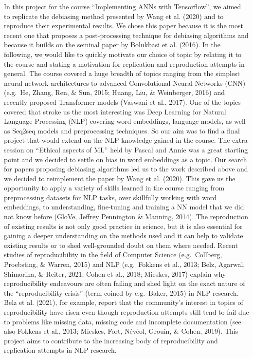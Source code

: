 \documentclass[
  english,
  man,floatsintext]{apa6}
\begin{document}
In this project for the course \enquote{Implementing ANNs with Tensorflow}, we aimed to replicate the debiasing method presented by Wang et al. (2020) and to reproduce their experimental results. We chose this paper because it is the most recent one that proposes a post-processing technique for debiasing algorithms and because it builds on the seminal paper by Bolukbasi et al. (2016).
In the following, we would like to quickly motivate our choice of topic by relating it to the course and stating a motivation for replication and reproduction attempts in general.
The course covered a huge breadth of topics ranging from the simplest neural network architectures to advanced Convolutional Neural Networks (CNN) (e.g.~He, Zhang, Ren, \& Sun, 2015; Huang, Liu, \& Weinberger, 2016) and recently proposed Transformer models (Vaswani et al., 2017). One of the topics covered that stroke us the most interesting was Deep Learning for Natural Language Processing (NLP) covering word embeddings, language models, as well as Seq2seq models and preprocessing techniques. So our aim was to find a final project that would extend on the NLP knowledge gained in the course. The extra session on \enquote{Ethical aspects of ML} held by Pascal and Annie was a great starting point and we decided to settle on bias in word embeddings as a topic. Our search for papers proposing debiasing algorithms led us to the work described above and we decided to reimplement the paper by Wang et al. (2020). This gave us the opportunity to apply a variety of skills learned in the course ranging from preprocessing datasets for NLP tasks, over skillfully working with word embeddings, to understanding, fine-tuning and training a NN model that we did not know before (GloVe, Jeffrey Pennington \& Manning, 2014).
The reproduction of existing results is not only good practice in science, but it is also essential for gaining a deeper understanding on the methods used and it can help to validate existing results or to shed well-grounded doubt on them where needed. Recent studies of reproducibility in the field of Computer Science (e.g.~Collberg, Proebsting, \& Warren, 2015) and NLP (e.g.~Fokkens et al., 2013; Belz, Agarwal, Shimorina, \& Reiter, 2021; Cohen et al., 2018; Mieskes, 2017) explain why reproducibility endeavours are often failing and shed light on the exact nature of the \enquote{reproducibility crisis} (term coined by e.g.~Baker, 2015) in NLP research. Belz et al. (2021), for example, report that the community's interest in topics of reproducibility have risen even though reproduction attempts still tend to fail due to problems like missing data, missing code and incomplete documentation (see also Fokkens et al., 2013; Mieskes, Fort, Névéol, Grouin, \& Cohen, 2019).
This project aims to contribute to the increasing body of reproducibility and replication attempts in NLP research.
\end{document}
